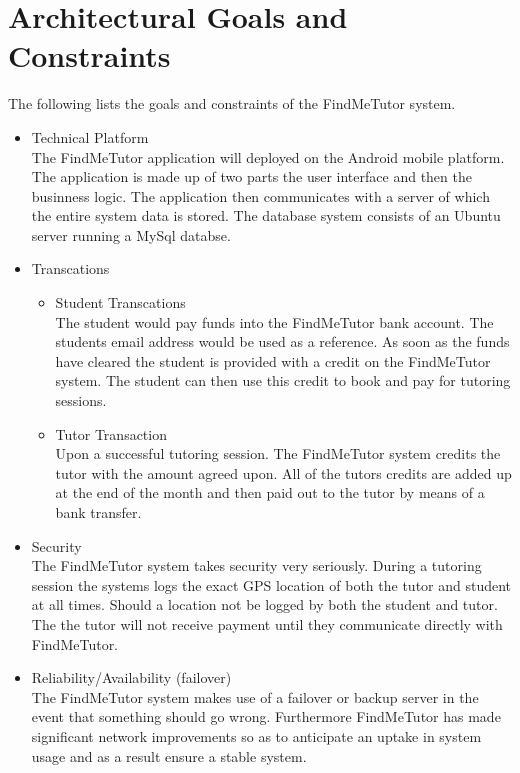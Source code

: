 \documentclass[12pt]{article}
\begin{document}
\section{Architectural Goals and Constraints}
The following lists the goals and constraints of the FindMeTutor system.
\begin{itemize}
\item Technical Platform\\
The FindMeTutor application will deployed on the Android mobile platform. The application is made up of two parts the user interface and then the businness logic. The application then communicates with a server of which the entire system data is stored. The database system consists of an Ubuntu server running a MySql databse. 
\item Transcations
\begin{itemize}
\item Student Transcations\\
The student would pay funds into the FindMeTutor bank account. The students email address would be used as a reference. As soon as the funds have cleared the student is provided with a credit on the FindMeTutor system. The student can then use this credit to book and pay for tutoring sessions.
\item Tutor Transaction\\
Upon a successful tutoring session. The FindMeTutor system credits the tutor with the amount agreed upon. All of the tutors credits are added up at the end of the month and then paid out to the tutor by means of a bank transfer. 
\end{itemize}
\item Security\\
The FindMeTutor system takes security very seriously. During a tutoring session the systems logs the exact GPS location of both the tutor and student at all times. Should a location not be logged by both the student and tutor. The the tutor will not receive payment until they communicate directly with FindMeTutor.
\item Reliability/Availability (failover)\\
The FindMeTutor system makes use of a failover or backup server in the event that something should go wrong. Furthermore FindMeTutor has made significant network improvements so as to anticipate an uptake in system usage and as a result ensure a stable system.
\end{itemize}
\end{document}
